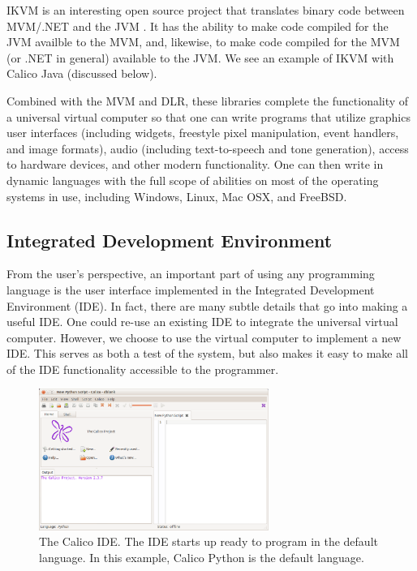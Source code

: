 \documentclass[preprint]{sigplanconf}
\begin{document}
IKVM is an interesting open source project that translates binary code
between MVM/.NET and the JVM \cite{ikvm}. It has the ability to make
code compiled for the JVM availble to the MVM, and, likewise, to make
code compiled for the MVM (or .NET in general) available to the
JVM. We see an example of IKVM with Calico Java (discussed below).

Combined with the MVM and DLR, these libraries complete the
functionality of a universal virtual computer so that one can write
programs that utilize graphics user interfaces (including widgets,
freestyle pixel manipulation, event handlers, and image formats),
audio (including text-to-speech and tone generation), access to
hardware devices, and other modern functionality. One can then write
in dynamic languages with the full scope of abilities on most of the
operating systems in use, including Windows, Linux, Mac OSX, and
FreeBSD.

\subsection{Integrated Development Environment}

From the user's perspective, an important part of using any
programming language is the user interface implemented in the
Integrated Development Environment (IDE). In fact, there are many
subtle details that go into making a useful IDE. One could re-use an
existing IDE to integrate the universal virtual computer. However, we
choose to use the virtual computer to implement a new IDE. This serves
as both a test of the system, but also makes it easy to make all of
the IDE functionality accessible to the programmer. 

\begin{figure}[h!]
  \centering
     \includegraphics[width=75mm]{calico.eps}
  \caption{The Calico IDE. The IDE starts up ready to program in the
    default language. In this example, Calico Python is the default
    language.}
  \label{calico-ide}
\end{figure}
\end{document}
